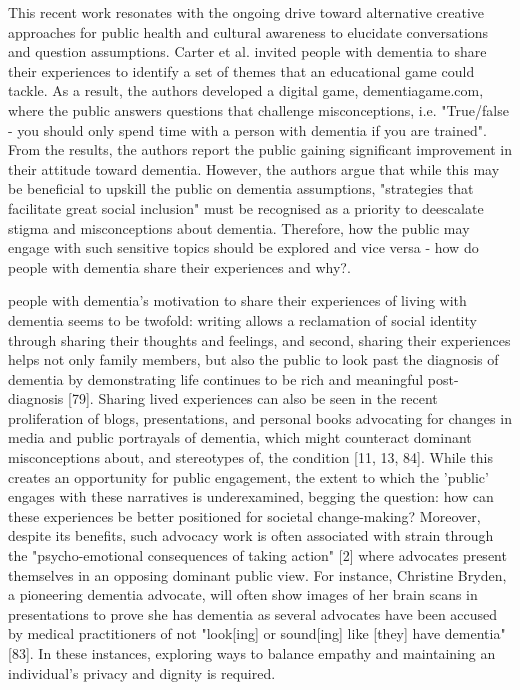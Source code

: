 This recent work resonates with the ongoing drive toward alternative creative approaches for public health and cultural awareness to elucidate conversations and question assumptions. Carter et al. invited people with dementia to share their experiences to identify a set of themes that an educational game could tackle. As a result, the authors developed a digital game, dementiagame.com, where the public answers questions that challenge misconceptions, i.e. "True/false - you should only spend time with a person with dementia if you are trained". From the results, the authors report the public gaining significant improvement in their attitude toward dementia. However, the authors argue that while this may be beneficial to upskill the public on dementia assumptions, "strategies that facilitate great social inclusion" must be recognised as a priority to deescalate stigma and misconceptions about dementia. Therefore, how the public may engage with such sensitive topics should be explored and vice versa - how do people with dementia share their experiences and why?.

people with dementia's motivation to share their experiences of living with dementia seems to be twofold: writing allows a reclamation of social identity through sharing their thoughts and feelings, and second, sharing their experiences helps not only family members, but also the public to look past the diagnosis of dementia by demonstrating life continues to be rich and meaningful post-diagnosis [79]. Sharing lived experiences can also be seen in the recent proliferation of blogs, presentations, and personal books advocating for changes in media and public portrayals of dementia, which might counteract dominant misconceptions about, and stereotypes of, the condition [11, 13, 84]. While this creates an opportunity for public engagement, the extent to which the 'public' engages with these narratives is underexamined, begging the question: how can these experiences be better positioned for societal change-making? Moreover, despite its benefits, such advocacy work is often associated with strain through the "psycho-emotional consequences of taking action" [2] where advocates present themselves in an opposing dominant public view. For instance, Christine Bryden, a pioneering dementia advocate, will often show images of her brain scans in presentations to prove she has dementia as several advocates have been accused by medical practitioners of not "look[ing] or sound[ing] like [they] have dementia" [83]. In these instances, exploring ways to balance empathy and maintaining an individual's privacy and dignity is required.

